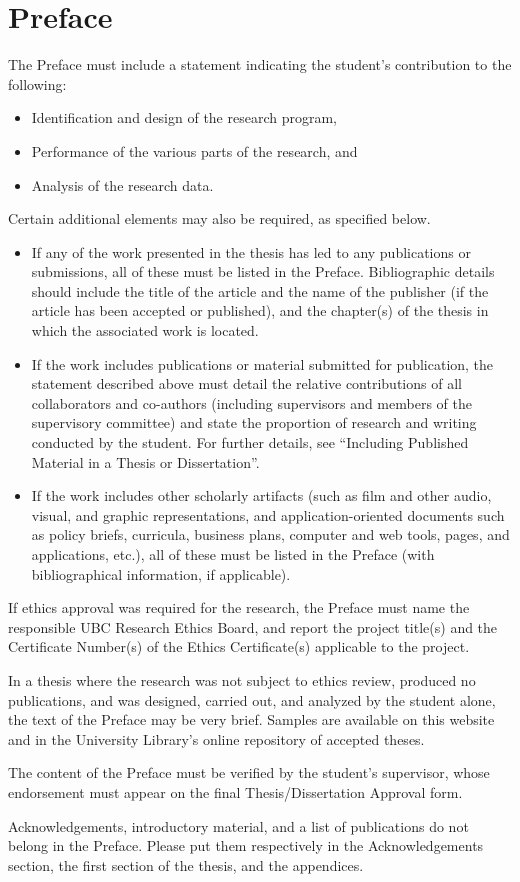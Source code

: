 \section{Preface}
The Preface must include a statement indicating the student's contribution to the following:
\begin{itemize}
  \item Identification and design of the research program,
  \item Performance of the various parts of the research, and
  \item Analysis of the research data.
\end{itemize}

\begin{flushleft}Certain additional elements may also be required, as specified below.\end{flushleft}
\begin{itemize}
  \item If any of the work presented in the thesis has led to any publications or submissions, all of these must be listed in the Preface. Bibliographic details should include the title of the article and the name of the publisher (if the article has been accepted or published), and the chapter(s) of the thesis in which the associated work is located.
  \item If the work includes publications or material submitted for publication, the statement described above must detail the relative contributions of all collaborators and co-authors (including supervisors and members of the supervisory committee) and state the proportion of research and writing conducted by the student. For further details, see “Including Published Material in a Thesis or Dissertation”.
  \item If the work includes other scholarly artifacts (such as film and other audio, visual, and graphic representations, and application-oriented documents such as policy briefs, curricula, business plans, computer and web tools, pages, and applications, etc.), all of these must be listed in the Preface (with bibliographical information, if applicable).
\end{itemize}

If ethics approval was required for the research, the Preface must name the responsible UBC Research Ethics Board, and report the project title(s) and the Certificate Number(s) of the Ethics Certificate(s) applicable to the project.

In a thesis where the research was not subject to ethics review, produced no publications, and was designed, carried out, and analyzed by the student alone, the text of the Preface may be very brief. Samples are available on this website and in the University Library's online repository of accepted theses.

The content of the Preface must be verified by the student's supervisor, whose endorsement must appear on the final Thesis/Dissertation Approval form.

Acknowledgements, introductory material, and a list of publications do not belong in the Preface. Please put them respectively in the Acknowledgements section, the first section of the thesis, and the appendices.
